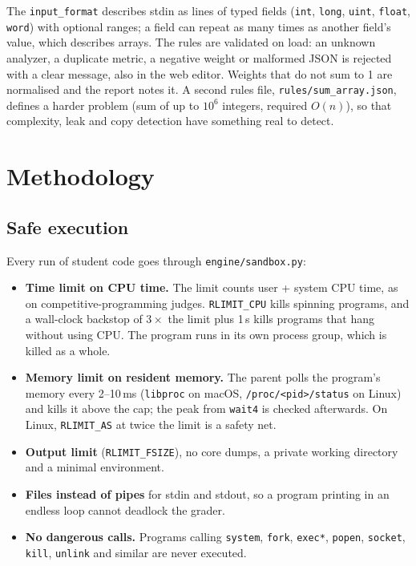 \documentclass[11pt,a4paper]{article}
\newcommand{\file}[1]{\nolinkurl{#1}}
\begin{document}
The \texttt{input\_format} describes stdin as lines of typed fields (\texttt{int}, \texttt{long}, \texttt{uint},
\texttt{float}, \texttt{word}) with optional ranges; a field can repeat as many times as another field's value, which
describes arrays. The rules are validated on load: an unknown analyzer, a duplicate metric, a negative weight or
malformed JSON is rejected with a clear message, also in the web editor. Weights that do not sum to 1 are normalised
and the report notes it. A second rules file, \file{rules/sum_array.json}, defines a harder problem (sum of up to
$10^6$ integers, required $O(n)$), so that complexity, leak and copy detection have something real to detect.

\section{Methodology}
\subsection{Safe execution}\label{sec:sandbox}
Every run of student code goes through \file{engine/sandbox.py}:
\begin{itemize}
  \item \textbf{Time limit on CPU time.} The limit counts user + system CPU time, as on competitive-programming judges.
        \texttt{RLIMIT\_CPU} kills spinning programs, and a wall-clock backstop of $3\times$ the limit plus 1\,s kills
        programs that hang without using CPU. The program runs in its own process group, which is killed as a whole.
  \item \textbf{Memory limit on resident memory.} The parent polls the program's memory every 2--10\,ms
        (\texttt{libproc} on macOS, \file{/proc/<pid>/status} on Linux) and kills it above the cap; the peak from
        \texttt{wait4} is checked afterwards. On Linux, \texttt{RLIMIT\_AS} at twice the limit is a safety net.
  \item \textbf{Output limit} (\texttt{RLIMIT\_FSIZE}), no core dumps, a private working directory and a minimal environment.
  \item \textbf{Files instead of pipes} for stdin and stdout, so a program printing in an endless loop cannot deadlock the grader.
  \item \textbf{No dangerous calls.} Programs calling \texttt{system}, \texttt{fork}, \texttt{exec*}, \texttt{popen},
        \texttt{socket}, \texttt{kill}, \texttt{unlink} and similar are never executed.
\end{itemize}
\end{document}
